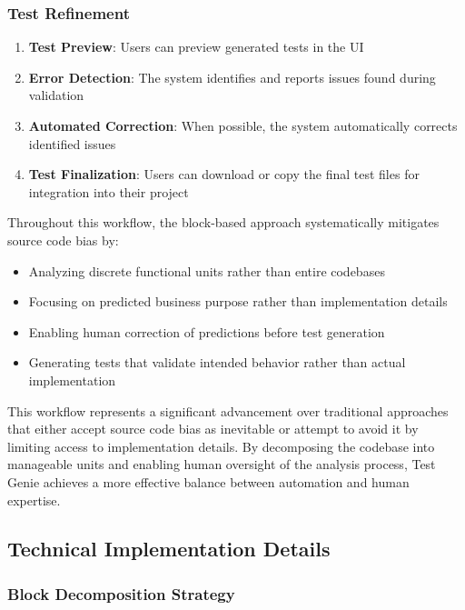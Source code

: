 \subsubsection{Test Refinement}

\begin{enumerate}
    \item \textbf{Test Preview}: Users can preview generated tests in the UI
    \item \textbf{Error Detection}: The system identifies and reports issues found during validation
    \item \textbf{Automated Correction}: When possible, the system automatically corrects identified issues
    \item \textbf{Test Finalization}: Users can download or copy the final test files for integration into their project
\end{enumerate}

\hspace{0.5cm}Throughout this workflow, the block-based approach systematically mitigates source code bias by:

\begin{itemize}
    \item Analyzing discrete functional units rather than entire codebases
    \item Focusing on predicted business purpose rather than implementation details
    \item Enabling human correction of predictions before test generation
    \item Generating tests that validate intended behavior rather than actual implementation
\end{itemize}

\hspace{0.5cm}This workflow represents a significant advancement over traditional approaches that either accept source code bias as inevitable or attempt to avoid it by limiting access to implementation details. By decomposing the codebase into manageable units and enabling human oversight of the analysis process, Test Genie achieves a more effective balance between automation and human expertise.

\subsection{Technical Implementation Details}

\subsubsection{Block Decomposition Strategy}

